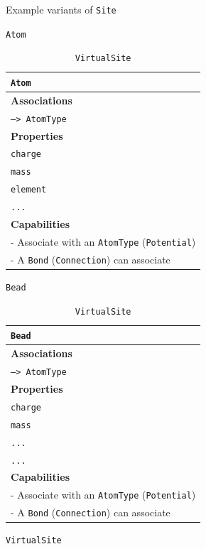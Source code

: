 \documentclass[12pt]{article}
\begin{document}
\begin{table}[ht]
    \centering
    \caption{Example variants of \texttt{Site}}
    \label{tab:ExampleSites}
    \begin{subtable}[h]{0.45\textwidth}
    \caption{\texttt{Atom}}
    \begin{tabular}{|l|}
         \hline
         \rowcolor{gray!50}
         \texttt{Atom}  \\
         \hline
         \textbf{Associations} \\
         \hline
         \texttt{--> AtomType}\\
         \textbf{Properties}\\
         \hline
         \texttt{charge} \\
         \texttt{mass} \\
         \texttt{element}\\
         \texttt{...}\\
         \hline
         \textbf{Capabilities}\\
         \hline
         - Associate with an \texttt{AtomType} (\texttt{Potential})\\
         - A \texttt{Bond} (\texttt{Connection}) can associate\\
        \hline
    \end{tabular}
    \end{subtable}
    \hfill
    \begin{subtable}[h]{0.45\textwidth}
    \caption{\texttt{Bead}}
    \begin{tabular}{|l|}

         \hline
         \rowcolor{gray!50}
         \texttt{Bead}  \\
         \hline
         \textbf{Associations} \\
         \hline
         \texttt{--> AtomType}\\
         \textbf{Properties}\\
         \hline
         \texttt{charge} \\
         \texttt{mass} \\
         \texttt{...}\\
         \texttt{...}\\
         \hline
         \textbf{Capabilities}\\
         \hline
        - Associate with an \texttt{AtomType} (\texttt{Potential})\\
        - A \texttt{Bond} (\texttt{Connection}) can associate\\
        \hline
    \end{tabular}
    \end{subtable}
    \newline
    \vspace*{1 cm}
    \newline
    \begin{subtable}[h]{0.45\textwidth}
    \caption{\texttt{VirtualSite}}
    \begin{tabular}{|l|}


\end{tabular}
\end{subtable}
\end{table}
\end{document}
